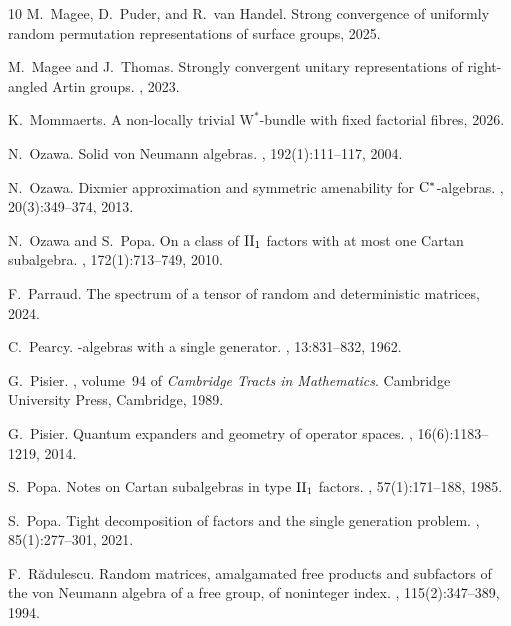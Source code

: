 \documentclass[10pt]{amsart}
\theoremstyle{definition}
\numberwithin{equation}{section}
\begin{document}
\begin{thebibliography}{10}
M.~Magee, D.~Puder, and R.~van Handel.
\newblock Strong convergence of uniformly random permutation representations of surface groups, 2025.

M.~Magee and J.~Thomas.
\newblock Strongly convergent unitary representations of right-angled {A}rtin groups.
, 2023.

K.~Mommaerts.
\newblock A non-locally trivial $\mathrm{W}^*$-bundle with fixed factorial fibres, 2026.

N.~Ozawa.
\newblock Solid von {N}eumann algebras.
, 192(1):111--117, 2004.

N.~Ozawa.
\newblock Dixmier approximation and symmetric amenability for {$\rm C^*$}-algebras.
, 20(3):349--374, 2013.

N.~Ozawa and S.~Popa.
\newblock On a class of {${\rm II}_1$} factors with at most one {C}artan subalgebra.
, 172(1):713--749, 2010.

F.~Parraud.
\newblock The spectrum of a tensor of random and deterministic matrices, 2024.

C.~Pearcy.
-algebras with a single generator.
, 13:831--832, 1962.

G.~Pisier.
, volume~94 of {\em Cambridge Tracts in Mathematics}.
\newblock Cambridge University Press, Cambridge, 1989.

G.~Pisier.
\newblock Quantum expanders and geometry of operator spaces.
, 16(6):1183--1219, 2014.

S.~Popa.
\newblock Notes on {C}artan subalgebras in type {${\rm II}_1$} factors.
, 57(1):171--188, 1985.

S.~Popa.
\newblock Tight decomposition of factors and the single generation problem.
, 85(1):277--301, 2021.

F.~R{\u{a}}dulescu.
\newblock Random matrices, amalgamated free products and subfactors of the von {N}eumann algebra of a free group, of noninteger index.
, 115(2):347--389, 1994.


\end{thebibliography}
\end{document}
